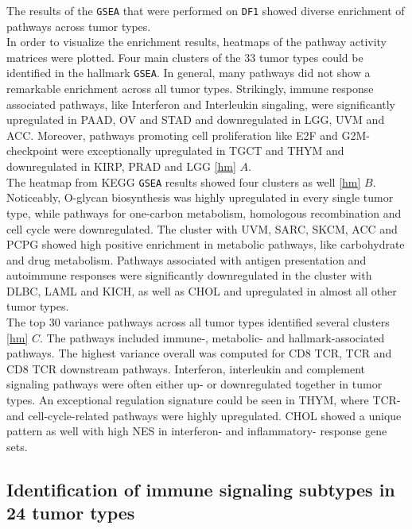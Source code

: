\documentclass[
  parskip,
  oneside]{scrreprt}
\begin{document}
The results of the \texttt{GSEA} that were performed on \texttt{DF1}
showed diverse enrichment of pathways across tumor types.\\
In order to visualize the enrichment results, heatmaps of the pathway
activity matrices were plotted. Four main clusters of the 33 tumor types
could be identified in the hallmark \texttt{GSEA}. In general, many
pathways did not show a remarkable enrichment across all tumor types.
Strikingly, immune response associated pathways, like Interferon and
Interleukin singaling, were significantly upregulated in PAAD, OV and
STAD and downregulated in LGG, UVM and ACC. Moreover, pathways promoting
cell proliferation like E2F and G2M-checkpoint were exceptionally
upregulated in TGCT and THYM and downregulated in KIRP, PRAD and LGG
\cref{hm} \(A\).\\
The heatmap from KEGG \texttt{GSEA} results showed four clusters as well
\cref{hm} \(B\). Noticeably, O-glycan biosynthesis was highly
upregulated in every single tumor type, while pathways for one-carbon
metabolism, homologous recombination and cell cycle were downregulated.
The cluster with UVM, SARC, SKCM, ACC and PCPG showed high positive
enrichment in metabolic pathways, like carbohydrate and drug metabolism.
Pathways associated with antigen presentation and autoimmune responses
were significantly downregulated in the cluster with DLBC, LAML and
KICH, as well as CHOL and upregulated in almost all other tumor types.\\
The top 30 variance pathways across all tumor types identified several
clusters \cref{hm} \(C\). The pathways included immune-, metabolic- and
hallmark-associated pathways. The highest variance overall was computed
for CD8 TCR, TCR and CD8 TCR downstream pathways. Interferon,
interleukin and complement signaling pathways were often either up- or
downregulated together in tumor types. An exceptional regulation
signature could be seen in THYM, where TCR- and cell-cycle-related
pathways were highly upregulated. CHOL showed a unique pattern as well
with high NES in interferon- and inflammatory- response gene sets.

\hypertarget{identification-of-immune-signaling-subtypes-in-24-tumor-types}{%
\subsection{Identification of immune signaling subtypes in 24 tumor
types}\label{identification-of-immune-signaling-subtypes-in-24-tumor-types}}
\end{document}
